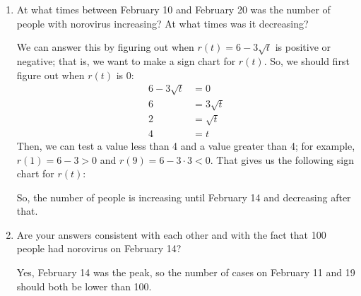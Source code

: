 \documentclass{article}
\begin{document}
\begin{enumerate}
\begin{enumerate}
  \item
    \begin{problem}
      At what times between February 10 and February 20 was the number of
      people with norovirus increasing?  At what times was it decreasing?
    \end{problem}

    \begin{solution}
      We can answer this by figuring out when $r(t) = 6 - 3 \sqrt{t}$ is
      positive or negative; that is, we want to make a sign chart for
      $r(t)$.  So, we should first figure out when $r(t)$ is 0:
      \begin{align*}
        6 - 3 \sqrt{t} &= 0 \\
        6 &= 3 \sqrt{t} \\
        2 &= \sqrt{t} \\
        4 &= t
      \end{align*}
      Then, we can test a value less than 4 and a value greater than 4;
      for example, $r(1) = 6 - 3 > 0$ and $r(9) = 6 - 3 \cdot 3 < 0$.
      That gives us the following sign chart for $r(t)$:
      \begin{center}
      \end{center}
      So, the number of people is increasing until February 14 and
      decreasing after that. 
    \end{solution}

  \item
    \begin{problem}
      Are your answers consistent with each other and with the fact that
      100 people had norovirus on February 14?
    \end{problem}
    \pspace{\vfill}

    \begin{solution}
      Yes, February 14 was the peak, so the number of cases on February 11
      and 19 should both be lower than 100.
    \end{solution}


\end{enumerate}
\end{enumerate}
\end{document}
